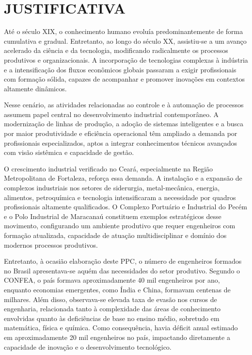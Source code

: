 \section{JUSTIFICATIVA}
\label{JUSTIFICATIVA}

Até o século XIX, o conhecimento humano evoluía predominantemente de forma cumulativa e gradual. Entretanto, ao longo do século XX, assistiu-se a um avanço acelerado da ciência e da tecnologia, modificando radicalmente os processos produtivos e organizacionais. A incorporação de tecnologias complexas à indústria e a intensificação dos fluxos econômicos globais passaram a exigir profissionais com formação sólida, capazes de acompanhar e promover inovações em contextos altamente dinâmicos.

Nesse cenário, as atividades relacionadas ao controle e à automação de processos assumem papel central no desenvolvimento industrial contemporâneo. A modernização de linhas de produção, a adoção de sistemas inteligentes e a busca por maior produtividade e eficiência operacional têm ampliado a demanda por profissionais especializados, aptos a integrar conhecimentos técnicos avançados com visão sistêmica e capacidade de gestão.

O crescimento industrial verificado no Ceará, especialmente na Região Metropolitana de Fortaleza, reforça essa demanda. A instalação e a expansão de complexos industriais nos setores de siderurgia, metal-mecânica, energia, alimentos, petroquímica e tecnologia intensificaram a necessidade por quadros profissionais altamente qualificados. O Complexo Portuário e Industrial do Pecém e o Polo Industrial de Maracanaú constituem exemplos estratégicos desse movimento, configurando um ambiente produtivo que requer engenheiros com formação atualizada, capacidade de atuação multidisciplinar e domínio dos modernos processos produtivos.


Entretanto, à ocasião elaboração deste PPC, o número de engenheiros formados no Brasil apresentava-se aquém das necessidades do setor produtivo. Segundo o CONFEA, o país formava aproximadamente 40 mil engenheiros por ano, enquanto economias emergentes, como Índia e China, formavam centenas de milhares. Além disso, observava-se elevada taxa de evasão nos cursos de engenharia, relacionada tanto à complexidade das áreas de conhecimento envolvidas quanto às deficiências de base no ensino médio, sobretudo em matemática, física e química. Como consequência, havia déficit anual estimado em aproximadamente 20 mil engenheiros no país, impactando diretamente a capacidade de inovação e o desenvolvimento tecnológico.


